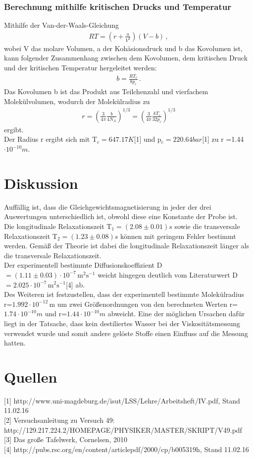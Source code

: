 \documentclass[]{scrartcl}
\begin{document}
\subsubsection{Berechnung mithilfe kritischen Drucks und Temperatur}
Mithilfe der Van-der-Waals-Gleichung 
\begin{align*}
RT = \left( r+\frac{a}{V^2}\right) (V-b)\, ,
\end{align*}
wobei V das molare Volumen, a der Kohäsionsdruck und b das Kovolumen ist, kann folgender Zusammenhang zwischen dem Kovolumen, dem kritischen Druck und der kritischen Temperatur hergeleitet werden:
\begin{align*}
b = \frac{RT_c}{8p_c}\,.
\end{align*}
Das Kovolumen b ist das Produkt aus Teilchenzahl und vierfachem Molekülvolumen, wodurch der Molekülradius zu
\begin{align*}
r= \left( \frac{3}{4\pi}\frac{b}{4N_A}\right) ^{1/3}=\left( \frac{3}{4\pi}\frac{kT_c}{32p_c}\right) ^{1/3}
\end{align*}
ergibt. \\
Der Radius r ergibt sich mit T$_c=647.17\si{K}$[1] und p$_c=220.64\si{bar}$[1] zu r =1.44$\cdot10^{-10}\si{m}$.

\section{Diskussion}
Auffällig ist, dass die Gleichgewichtsmagnetisierung in jeder der drei Auswertungen unterschiedlich ist, obwohl diese eine Konstante der Probe ist. \\
Die longitudinale Relaxationszeit T$_1=(2.08 \pm 0.01)\si{s}$ sowie die transversale Relaxationszeit T$_2=(1.23 \pm 0.08)\si{s}$ können mit geringem Fehler bestimmt werden. Gemäß der Theorie ist dabei die longitudinale Relaxationszeit länger als die transversale Relaxationszeit. \\
Der experimentell bestimmte Diffusionskoeffizient D\,$=(1.11\pm 0.03) \cdot10^{-7}\,\text{m}^2\text{s}^{-1}$ weicht hingegen deutlich vom Literaturwert D\,$=2.025\cdot10^{-7}\,\text{m}^2\text{s}^{-1}$[4] ab. \\
Des Weiteren ist festzustellen, dass der experimentell bestimmte Molekülradius r=$ 1.992\cdot10^{-12}\,\text{m}$ um zwei Größenordnungen von den berechneten Werten r=$1.74\cdot10^{-10}\si{m}$ und r=$1.44\cdot10^{-10}\si{m}$ abweicht. Eine der möglichen Ursachen dafür liegt in der Tatsache, dass kein destiliertes Wasser bei der Viskositätsmessung verwendet wurde und somit andere gelöste Stoffe einen Einfluss auf die Messung hatten.

\section{Quellen}
{[1]} http://www.uni-magdeburg.de/isut/LSS/Lehre/Arbeitsheft/IV.pdf, Stand 11.02.16 \\
{[2]} Versuchsanleitung zu Versuch 49:
http://129.217.224.2/HOMEPAGE/PHYSIKER/MASTER/SKRIPT/V49.pdf \\
{[3]} Das große Tafelwerk, Cornelsen, 2010 \\
{[4]} http://pubs.rsc.org/en/content/articlepdf/2000/cp/b005319h, Stand 11.02.16
\end{document}
